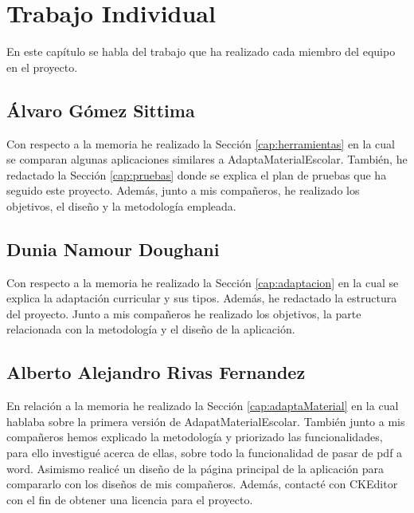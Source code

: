 \chapter{Trabajo Individual}
\label{cap:TrabajoIndividual}

En este capítulo se habla del trabajo que ha realizado cada miembro del equipo en el proyecto.

\section{Álvaro Gómez Sittima}
Con respecto a la memoria he realizado la Sección \ref{cap:herramientas} en la cual se comparan algunas aplicaciones similares a AdaptaMaterialEscolar. También, he redactado la Sección \ref{cap:pruebas} donde se explica el plan de pruebas que ha seguido este proyecto. Además, junto a mis compañeros, he realizado los objetivos, el diseño y la metodología empleada.

\section{Dunia Namour Doughani}
Con respecto a la memoria he realizado la Sección \ref{cap:adaptacion} en la cual se explica la adaptación curricular y sus tipos. Además, he redactado la estructura del proyecto. Junto a mis compañeros he realizado los objetivos, la parte relacionada con la metodología y el diseño de la aplicación.

\section{Alberto Alejandro Rivas Fernandez}
En relación a la memoria he realizado la Sección \ref{cap:adaptaMaterial} en la cual hablaba sobre la primera versión de AdapatMaterialEscolar. También junto a mis compañeros hemos explicado la metodología y priorizado las funcionalidades, para ello investigué acerca de ellas, sobre todo la funcionalidad de pasar de pdf a word. Asimismo realicé un diseño de la página principal de la aplicación para compararlo con los diseños de mis compañeros. Además, contacté con CKEditor con el fin de obtener una licencia para el proyecto.

